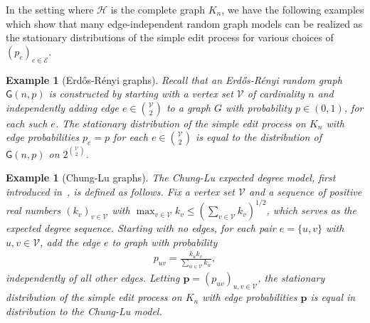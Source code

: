 \documentclass[11pt,a4paper]{article}
\newtheorem{example}[theorem]{Example}
\begin{document}
In the setting where $\mathcal{H}$ is the complete graph $K_n$, we have the following examples which show that many edge-independent random graph models can be realized as the stationary distributions of the simple edit process for various choices of $(p_e)_{e\in\mathcal{E}}$.

\begin{example}[Erd\H{o}s-R\'{e}nyi graphs]\normalfont\label{ex:stationary-er}
    Recall that an Erd\H{o}s-R\'{e}nyi random graph $\mathsf{G}(n, p)$ is constructed by starting with a vertex set $\mathcal{V}$ of cardinality $n$ and independently adding edge $e\in {\mathcal{V} \choose 2}$ to a graph $G$ with probability $p\in(0, 1)$, for each such $e$. The stationary distribution of the simple edit process on $K_n$ with edge probabilities $p_e = p$ for each $e\in {\mathcal{V} \choose 2}$ is equal to the distribution of $\mathsf{G}(n, p)$ on $2^{{\mathcal{V}\choose 2}}$.
\end{example}

\begin{example}[Chung-Lu graphs]\normalfont\label{ex:stationary-cl}
    The Chung-Lu expected degree model, first introduced in~\cite{aiello2001random}, is defined as follows. Fix a vertex set $\mathcal{V}$ and a sequence of positive real numbers $(k_v)_{v\in\mathcal{V}}$ with $\max_{v\in\mathcal{V}}k_v\leq ({\sum_{v\in\mathcal{V}} k_v})^{1/2}$,
    which serves as the expected degree sequence. Starting with no edges, for each pair $e=\{u, v\}$ with $u, v\in\mathcal{V}$, add the edge $e$ to graph with probability
        \begin{align*}
            p_{uv} = \frac{k_u k_v }{\sum_{w\in\mathcal{V}} k_w},
        \end{align*}
    independently of all other edges. Letting $\mathbf{p} = (p_{uv})_{u, v\in\mathcal{V}}$, the stationary distribution of the simple edit process on $K_n$ with edge probabilities $\mathbf{p}$ is equal in distribution to the Chung-Lu model.
\end{example}
    
\end{document}

